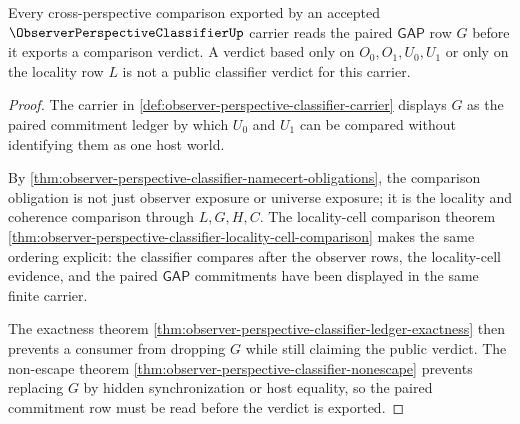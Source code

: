 \begin{theorem}
\label{thm:observer-perspective-classifier-gap-commitment-readback}
Every cross-perspective comparison exported by an accepted $\ObserverPerspectiveClassifierUp$ carrier reads the paired $\mathsf{GAP}$ row $G$ before it exports a comparison verdict. A verdict based only on $O_0,O_1,U_0,U_1$ or only on the locality row $L$ is not a public classifier verdict for this carrier.
\end{theorem}
\begin{proof}
The carrier in \autoref{def:observer-perspective-classifier-carrier} displays $G$ as the paired commitment ledger by which $U_0$ and $U_1$ can be compared without identifying them as one host world.

By \autoref{thm:observer-perspective-classifier-namecert-obligations}, the comparison obligation is not just observer exposure or universe exposure; it is the locality and coherence comparison through $L,G,H,C$. The locality-cell comparison theorem \autoref{thm:observer-perspective-classifier-locality-cell-comparison} makes the same ordering explicit: the classifier compares after the observer rows, the locality-cell evidence, and the paired $\mathsf{GAP}$ commitments have been displayed in the same finite carrier.

The exactness theorem \autoref{thm:observer-perspective-classifier-ledger-exactness} then prevents a consumer from dropping $G$ while still claiming the public verdict. The non-escape theorem \autoref{thm:observer-perspective-classifier-nonescape} prevents replacing $G$ by hidden synchronization or host equality, so the paired commitment row must be read before the verdict is exported.
\end{proof}

